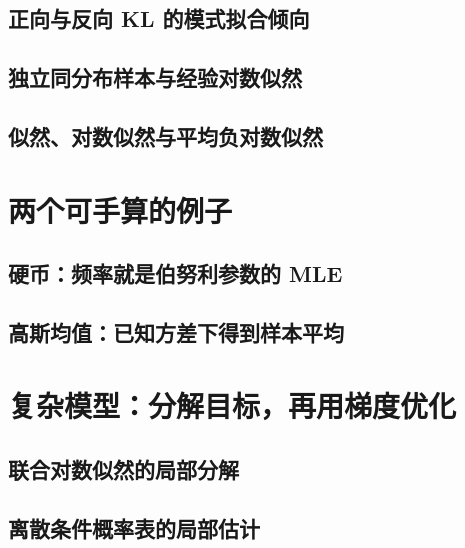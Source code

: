 \subsection{正向与反向 KL 的模式拟合倾向}
\label{subsec:mle-direction}
\contentplaceholder

\subsection{独立同分布样本与经验对数似然}
\label{subsec:mle-empirical}
\contentplaceholder

\subsection{似然、对数似然与平均负对数似然}
\label{subsec:mle-nll}
\contentplaceholder

\section{两个可手算的例子}
\label{sec:mle-examples}
\contentplaceholder

\subsection{硬币：频率就是伯努利参数的 MLE}
\label{subsec:mle-bernoulli}
\contentplaceholder

\subsection{高斯均值：已知方差下得到样本平均}
\label{subsec:mle-gaussian}
\contentplaceholder

\section{复杂模型：分解目标，再用梯度优化}
\label{sec:mle-optimization}
\contentplaceholder

\subsection{联合对数似然的局部分解}
\label{subsec:mle-local}
\contentplaceholder

\subsection{离散条件概率表的局部估计}
\label{subsec:mle-cpt}
\contentplaceholder

